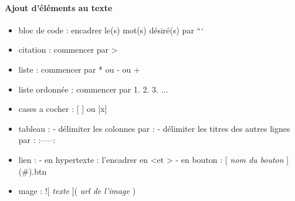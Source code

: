 \paragraph{Ajout d'éléments au texte}
\begin{itemize}
	\item bloc de code : encadrer le(s) mot(s) désiré(s) par ```
	\item citation : commencer par \textgreater
	\item liste : commencer par * ou - ou +
	\item liste ordonnée : commencer par 1. 2. 3. ...
	\item cases a cocher : [ ] ou [x]
	\item tableau :
		- délimiter les colonnes par : \textbar
		- délimiter les titres des autres lignes par : :-----:
	\item lien :
		- en hypertexte : l'encadrer en \textless et \textgreater
		- en bouton : [ \textit{nom du bouton} ](\#){.btn }
	\item mage : ![ \textit{texte} ]( \textit{url de l'image} )
\end{itemize}

